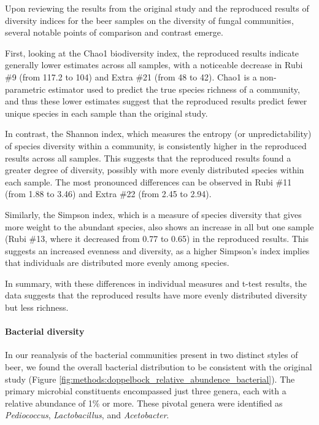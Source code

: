 Upon reviewing the results from the original study and the reproduced results of diversity indices for the beer samples on the diversity of fungal communities, several notable points of comparison and contrast emerge.

First, looking at the Chao1 biodiversity index, the reproduced results indicate generally lower estimates across all samples, with a noticeable decrease in Rubi \#9 (from 117.2 to 104) and Extra \#21 (from 48 to 42). Chao1 is a non-parametric estimator used to predict the true species richness of a community, and thus these lower estimates suggest that the reproduced results predict fewer unique species in each sample than the original study.

In contrast, the Shannon index, which measures the entropy (or unpredictability) of species diversity within a community, is consistently higher in the reproduced results across all samples. This suggests that the reproduced results found a greater degree of diversity, possibly with more evenly distributed species within each sample. The most pronounced differences can be observed in Rubi \#11 (from 1.88 to 3.46) and Extra \#22 (from 2.45 to 2.94).

Similarly, the Simpson index, which is a measure of species diversity that gives more weight to the abundant species, also shows an increase in all but one sample (Rubi \#13, where it decreased from 0.77 to 0.65) in the reproduced results. This suggests an increased evenness and diversity, as a higher Simpson's index implies that individuals are distributed more evenly among species.

In summary, with these differences in individual measures and t-test results, the data suggests that the reproduced results have more evenly distributed diversity but less richness.

    \paragraph*{Bacterial diversity}

In our reanalysis of the bacterial communities present in two distinct styles of beer, we found the overall bacterial distribution to be consistent with the original study (Figure \ref{fig:methods:doppelbock_relative_abundence_bacterial}). The primary microbial constituents encompassed just three genera, each with a relative abundance of 1\% or more. These pivotal genera were identified as \textit{Pediococcus}, \textit{Lactobacillus}, and \textit{Acetobacter}.

